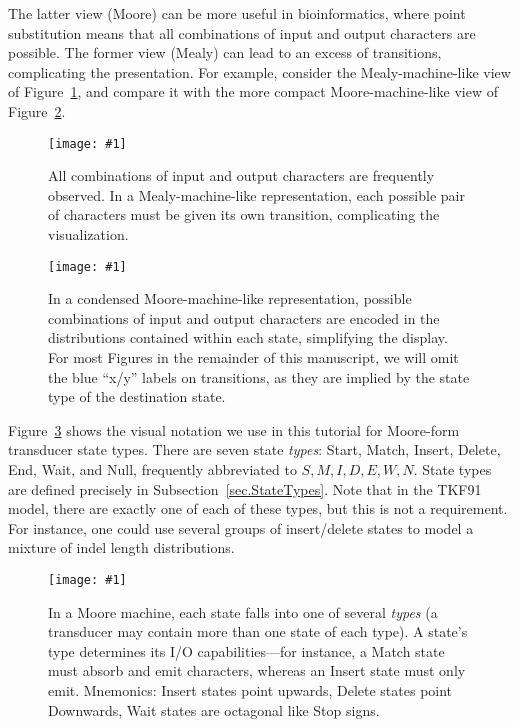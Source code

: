 \documentclass{article}
\newcommand{\secref}[1]{Subsection~\ref{sec.#1}}
\newcommand{\figref}[1]{Figure~\ref{Figures.#1}}
\newcommand{\figlabel}[1]{\label{Figures.#1}}
\newcommand{\easyfig}[4]{
\begin{figure}
\texttt{[image: \#1]}
\caption{ \figlabel{#3} #4}
\end{figure}}
\newcommand{\widepngfig}[2]{\easyfig{#1.png}{width=\textwidth}{#1}{#2}}
\newcommand{\widepdffig}[2]{\easyfig{#1-fig.pdf}{width=\textwidth}{#1}{#2}}
\begin{document}
The latter view (Moore) can be more useful in bioinformatics,
where point substitution means that all combinations of input and output characters 
are possible.  
The former view (Mealy) can lead to an excess of transitions, complicating the presentation.  
For example, consider the Mealy-machine-like view of  \figref{fanned-emission},
and compare it with the more compact Moore-machine-like view of \figref{condensed-emission}.  

\widepngfig{fanned-emission}
{All combinations of input and output characters are frequently observed.  
In a Mealy-machine-like representation, each possible pair of characters must be given its own transition, complicating the visualization.}

\widepngfig{condensed-emission}
{In a condensed Moore-machine-like representation, possible combinations of input and output characters are encoded in the distributions contained within each state,
simplifying the display.  
For most Figures in the remainder of this manuscript, we will omit the blue ``x/y'' labels on transitions,
as they are implied by the state type of the destination state.}

\figref{legend} shows the visual notation we use in this tutorial for Moore-form transducer state types.
There are seven state {\em types}: Start, Match, Insert, Delete, End, Wait, and Null, frequently abbreviated to $S,M,I,D,E,W,N$.
State types are defined precisely in \secref{StateTypes}.
Note that in the TKF91 model, there are exactly one of each of these types, but this is not a requirement.  For instance, one could use several groups of insert/delete states to model a mixture of indel length distributions.  

\widepdffig{legend}{In a Moore machine, each state falls into one of several {\em types} (a transducer may contain more than one state of each type).  
A state's type determines its I/O capabilities---for instance, a Match state must absorb and emit characters, whereas an Insert state must only emit.
Mnemonics: Insert states point upwards, Delete states point Downwards, Wait states are octagonal like Stop signs.
}
\end{document}
